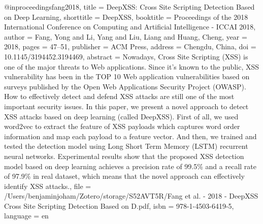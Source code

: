 @inproceedings{fang2018,
  title = {{{DeepXSS}}: {{Cross Site Scripting Detection Based}} on {{Deep Learning}}},
  shorttitle = {{{DeepXSS}}},
  booktitle = {Proceedings of the 2018 {{International Conference}} on {{Computing}} and {{Artificial Intelligence}} - {{ICCAI}} 2018},
  author = {Fang, Yong and Li, Yang and Liu, Liang and Huang, Cheng},
  year = {2018},
  pages = {47--51},
  publisher = {{ACM Press}},
  address = {{Chengdu, China}},
  doi = {10.1145/3194452.3194469},
  abstract = {Nowadays, Cross Site Scripting (XSS) is one of the major threats to Web applications. Since it's known to the public, XSS vulnerability has been in the TOP 10 Web application vulnerabilities based on surveys published by the Open Web Applications Security Project (OWASP). How to effectively detect and defend XSS attacks are still one of the most important security issues. In this paper, we present a novel approach to detect XSS attacks based on deep learning (called DeepXSS). First of all, we used word2vec to extract the feature of XSS payloads which captures word order information and map each payload to a feature vector. And then, we trained and tested the detection model using Long Short Term Memory (LSTM) recurrent neural networks. Experimental results show that the proposed XSS detection model based on deep learning achieves a precision rate of 99.5\% and a recall rate of 97.9\% in real dataset, which means that the novel approach can effectively identify XSS attacks.},
  file = {/Users/benjaminjoham/Zotero/storage/S52AVT5R/Fang et al. - 2018 - DeepXSS Cross Site Scripting Detection Based on D.pdf},
  isbn = {978-1-4503-6419-5},
  language = {en}
}

